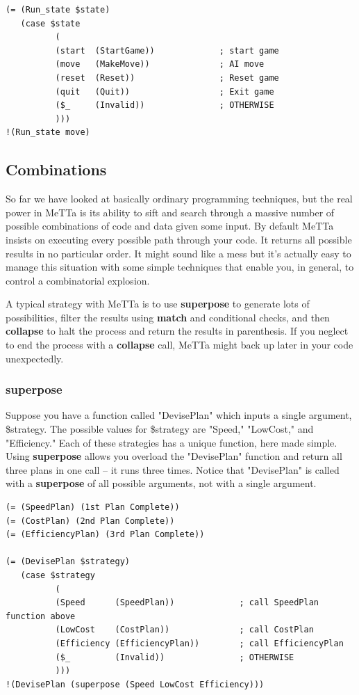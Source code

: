 \documentclass{article}
\begin{document}
\begin{verbatim}
(= (Run_state $state)
   (case $state
          (
          (start  (StartGame))             ; start game
          (move   (MakeMove))              ; AI move
          (reset  (Reset))                 ; Reset game
          (quit   (Quit))                  ; Exit game
          ($_     (Invalid))               ; OTHERWISE
          )))
!(Run_state move)
\end{verbatim}

\subsection{Combinations}

So far we have looked at basically ordinary programming techniques, but the real power in MeTTa is its ability to sift and search through a massive number of possible combinations of code and data given some input. By default MeTTa insists on executing every possible path through your code. It returns all possible results in no particular order. It might sound like a mess but it's actually easy to manage this situation with some simple techniques that enable you, in general, to control a combinatorial explosion.

A typical strategy with MeTTa is to use \textbf{superpose} to generate lots of possibilities, filter the results using \textbf{match} and conditional checks, and then \textbf{collapse} to halt the process and return the results in parenthesis. If you neglect to end the process with a \textbf{collapse} call, MeTTa might back up later in your code unexpectedly.

\subsubsection{superpose}

Suppose you have a function called "DevisePlan" which inputs a single argument, \$strategy. The possible values for \$strategy are "Speed," "LowCost," and "Efficiency." Each of these strategies has a unique function, here made simple. Using \textbf{superpose} allows you overload the "DevisePlan" function and return all three plans in one call -- it runs three times. Notice that "DevisePlan" is called with a \textbf{superpose} of all possible arguments, not with a single argument.

\begin{verbatim}
(= (SpeedPlan) (1st Plan Complete))
(= (CostPlan) (2nd Plan Complete))
(= (EfficiencyPlan) (3rd Plan Complete))

(= (DevisePlan $strategy)
   (case $strategy
          (
          (Speed      (SpeedPlan))             ; call SpeedPlan function above
          (LowCost    (CostPlan))              ; call CostPlan
          (Efficiency (EfficiencyPlan))        ; call EfficiencyPlan
          ($_         (Invalid))               ; OTHERWISE
          )))
!(DevisePlan (superpose (Speed LowCost Efficiency)))
\end{verbatim}
\end{document}
